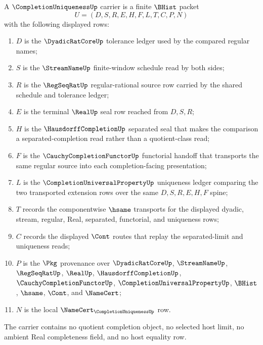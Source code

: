 \begin{definition}
\label{def:completion-uniqueness-carrier}
A $\CompletionUniquenessUp$ carrier is a finite $\BHist$ packet
$$
U=(D,S,R,E,H,F,L,T,C,P,N)
$$
with the following displayed rows:
\begin{enumerate}
\item $D$ is the $\DyadicRatCoreUp$ tolerance ledger used by the compared regular names;
\item $S$ is the $\StreamNameUp$ finite-window schedule read by both sides;
\item $R$ is the $\RegSeqRatUp$ regular-rational source row carried by the shared schedule and tolerance ledger;
\item $E$ is the terminal $\RealUp$ seal row reached from $D,S,R$;
\item $H$ is the $\HausdorffCompletionUp$ separated seal that makes the comparison a separated-completion read rather than a quotient-class read;
\item $F$ is the $\CauchyCompletionFunctorUp$ functorial handoff that transports the same regular source into each completion-facing presentation;
\item $L$ is the $\CompletionUniversalPropertyUp$ uniqueness ledger comparing the two transported extension rows over the same $D,S,R,E,H,F$ spine;
\item $T$ records the componentwise $\hsame$ transports for the displayed dyadic, stream, regular, Real, separated, functorial, and uniqueness rows;
\item $C$ records the displayed $\Cont$ routes that replay the separated-limit and uniqueness reads;
\item $P$ is the $\Pkg$ provenance over $\DyadicRatCoreUp$, $\StreamNameUp$, $\RegSeqRatUp$, $\RealUp$, $\HausdorffCompletionUp$, $\CauchyCompletionFunctorUp$, $\CompletionUniversalPropertyUp$, $\BHist$, $\hsame$, $\Cont$, and $\NameCert$;
\item $N$ is the local $\NameCert_{\CompletionUniquenessUp}$ row.
\end{enumerate}
The carrier contains no quotient completion object, no selected host limit, no ambient Real completeness field, and no host equality row.
\end{definition}

